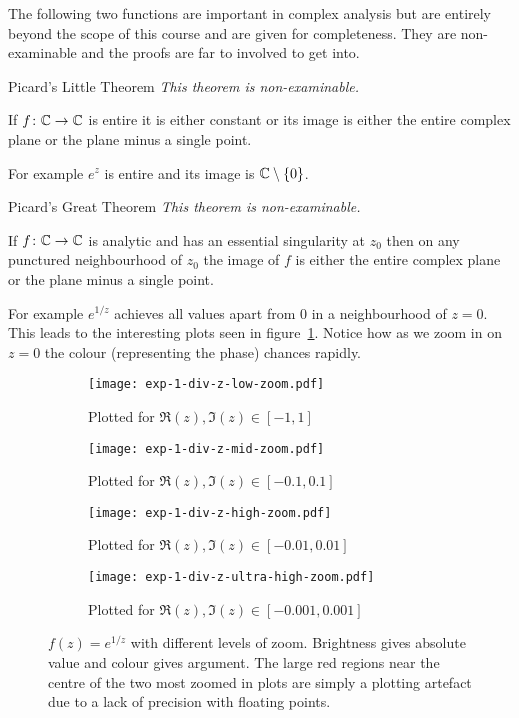 \documentclass{article}
\begin{document}
    The following two functions are important in complex analysis but are entirely beyond the scope of this course and are given for completeness.
    They are non-examinable and the proofs are far to involved to get into.
    \begin{theorem*}{Picard's Little Theorem}
        \emph{This theorem is non-examinable.}
        
        If \(f\colon\mathbb{C}\to\mathbb{C}\) is entire it is either constant or its image is either the entire complex plane or the plane minus a single point.
    \end{theorem*}
    For example \(e^z\) is entire and its image is \(\mathbb{C}\setminus\{0\}\).
    \begin{theorem*}{Picard's Great Theorem}
        \emph{This theorem is non-examinable.}
        
        If \(f\colon\mathbb{C}\to\mathbb{C}\) is analytic and has an essential singularity at \(z_0\) then on any punctured neighbourhood of \(z_0\) the image of \(f\) is either the entire complex plane or the plane minus a single point.
    \end{theorem*}
    For example \(e^{1/z}\) achieves all values apart from 0 in a neighbourhood of \(z = 0\).
    This leads to the interesting plots seen in figure~\ref{fig:exp(1/z)}.
    Notice how as we zoom in on \(z = 0\) the colour (representing the phase) chances rapidly.
    \begin{figure}
        \centering
        \begin{subfigure}{0.48\textwidth}
            \centering
            \texttt{[image: exp-1-div-z-low-zoom.pdf]}
            \caption{Plotted for \(\Re(z), \Im(z)\in[-1, 1]\)}
        \end{subfigure}
        \begin{subfigure}{0.48\textwidth}
            \centering
            \texttt{[image: exp-1-div-z-mid-zoom.pdf]}
            \caption{Plotted for \(\Re(z), \Im(z)\in[-0.1, 0.1]\)}
        \end{subfigure}
        \begin{subfigure}{\textwidth}
            \centering
            \texttt{[image: exp-1-div-z-high-zoom.pdf]}
            \caption{Plotted for \(\Re(z), \Im(z)\in[-0.01, 0.01]\)}
        \end{subfigure}
        \begin{subfigure}{0.48\textwidth}
            \centering
            \texttt{[image: exp-1-div-z-ultra-high-zoom.pdf]}
            \caption{Plotted for \(\Re(z), \Im(z)\in[-0.001, 0.001]\)}
        \end{subfigure}
        \caption{\(f(z) = e^{1/z}\) with different levels of zoom. Brightness gives absolute value and colour gives argument. The large red regions near the centre of the two most zoomed in plots are simply a plotting artefact due to a lack of precision with floating points.}
        \label{fig:exp(1/z)}
    \end{figure}
\end{document}
